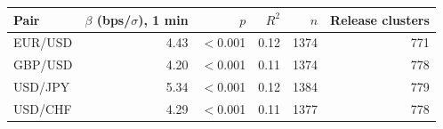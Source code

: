 \begin{tabular}{lrrrrr}
\toprule
Pair & $\beta$ (bps/$\sigma$), 1 min & $p$ & $R^2$ & $n$ & Release clusters \\
\midrule
EUR/USD & 4.43 & $<$0.001 & 0.12 & 1374 & 771 \\
GBP/USD & 4.20 & $<$0.001 & 0.11 & 1374 & 778 \\
USD/JPY & 5.34 & $<$0.001 & 0.12 & 1384 & 779 \\
USD/CHF & 4.29 & $<$0.001 & 0.11 & 1377 & 778 \\
\bottomrule
\end{tabular}
